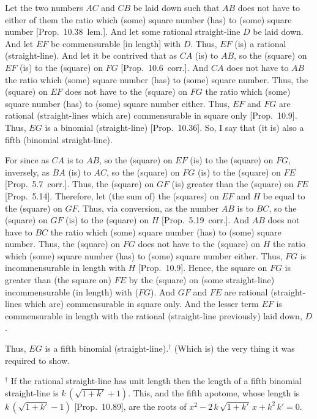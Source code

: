\begin{Parallel}{}{}
{Let the two numbers $AC$ and $CB$ be laid down such that $AB$ does
not have to either of them the ratio which (some) square number (has)
to (some) square number [Prop.~10.38~lem.]. And
let some rational straight-line $D$ be laid down. And let $EF$ be
commensurable [in length] with $D$. Thus, $EF$ (is) a rational (straight-line).
And let it be contrived that as $CA$ (is) to $AB$, so the (square) on
$EF$ (is) to the (square) on $FG$ [Prop.~10.6~corr.].
 And $CA$ does not have to $AB$ the ratio which (some)
 square number (has) to (some) square number. Thus, the (square) on
 $EF$ does not have to the (square) on $FG$ the ratio which (some)
 square number (has) to (some) square number either. Thus, $EF$ and
 $FG$ are rational (straight-lines which are) commensurable in square only
 [Prop.~10.9].  Thus, $EG$ is a binomial (straight-line) [Prop.~10.36]. So, I say that (it is) also
 a fifth (binomial straight-line).
 
 For since as $CA$ is to $AB$, so the (square) on $EF$ (is) to the (square)
 on $FG$, inversely, as $BA$ (is) to $AC$, so the (square) on $FG$ (is)
 to the (square) on $FE$ [Prop.~5.7~corr.]. Thus,
 the (square) on $GF$ (is) greater than the (square) on $FE$ [Prop.~5.14]. Therefore, let (the sum of) the (squares)
 on $EF$ and $H$ be equal to the (square) on $GF$. Thus, via conversion, 
 as the number $AB$ is to $BC$, so the (square) on $GF$ (is) to
 the (square) on $H$ [Prop.~5.19~corr.]. 
 And $AB$ does not have to $BC$ the ratio which (some) square number
 (has) to (some) square number. Thus, the (square) on $FG$ does not have
 to the (square) on $H$ the ratio which (some) square number (has) to
 (some) square number either. Thus, $FG$ is incommensurable in length
 with $H$ [Prop.~10.9]. Hence, the square on $FG$
 is greater than (the square on) $FE$ by the (square) on (some straight-line)
 incommensurable (in length) with ($FG$). And $GF$ and $FE$ are rational (straight-lines
 which are) commensurable in square only. And the lesser term $EF$ is commensurable in length with the  rational (straight-line previously)  laid down, $D$.
 
 Thus, $EG$ is a fifth binomial (straight-line).$^\dag$  (Which is) the very thing it
 was required to show.}
\end{Parallel}
{\footnotesize\noindent $^\dag$ If the rational straight-line has unit length then the length of a fifth binomial straight-line
is  $k\,(\sqrt{1+k'}+1)$. This, and the fifth apotome,
whose length is $k\,(\sqrt{1+k'}-1)$ [Prop.~10.89],
are the roots of $x^2- 2\,k\,\sqrt{1+k'}\,x+k^2\,k'=0$.}
 
